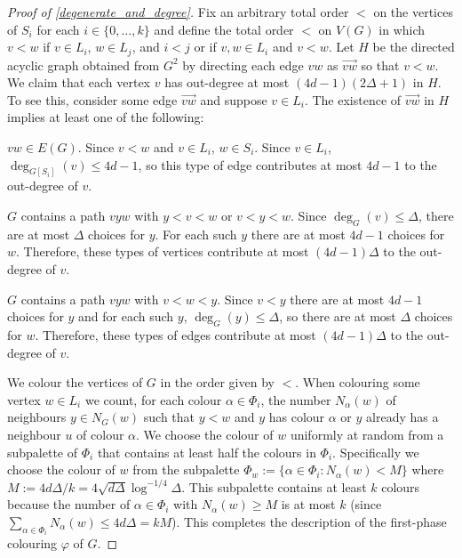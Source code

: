 \documentclass{patmorin}
\begin{document}
\begin{proof}[Proof of \cref{degenerate_and_degree}]
  Fix an arbitrary total order $<$ on the vertices of $S_i$ for each $i\in\{0,\ldots,k\}$ and define the total order $<$ on $V(G)$ in which $v <w$ if $v\in L_i$, $w\in L_j$, and $i<j$ or if $v,w\in L_i$ and $v<w$.  Let $H$ be the directed acyclic graph obtained from $G^2$ by directing each edge $vw$ as $\overrightarrow{vw}$ so that $v<w$.  We claim that each vertex $v$ has out-degree at most $(4d-1)(2\Delta+1)$ in $H$.  To see this, consider some edge $\overrightarrow{vw}$ and suppose $v\in L_i$.  The existence of $\overrightarrow{vw}$ in $H$ implies at least one of the following:
  \begin{compactenum}
    \item $vw\in E(G)$.  Since $v<w$ and $v\in L_i$, $w\in S_i$.  Since $v\in L_i$, $\deg_{G[S_i]}(v)\le 4d-1$, so this type of edge contributes at most $4d-1$ to the out-degree of $v$.
    \item $G$ contains a path $vyw$ with $y < v < w$ or $v < y < w$.  Since $\deg_G(v)\le\Delta$, there are at most $\Delta$ choices for $y$.  For each such $y$ there are at most $4d-1$ choices for $w$.  Therefore, these types of vertices contribute at most $(4d-1)\Delta$ to the out-degree of $v$.
    \item $G$ contains a path $vyw$ with $v < w < y$.  Since $v<y$ there are at most $4d-1$ choices for $y$ and for each such $y$, $\deg_G(y)\le\Delta$, so there are at most $\Delta$ choices for $w$.  Therefore, these types of edges contribute at most $(4d-1)\Delta$ to the out-degree of $v$.
  \end{compactenum}
  We colour the vertices of $G$ in the order given by $<$.  When colouring some vertex $w\in L_i$ we count, for each colour $\alpha\in \Phi_i$, the number $N_\alpha(w)$ of neighbours $y\in N_G(w)$ such that $y < w$ and $y$ has colour $\alpha$ or $y$ already has a neighbour $u$ of colour $\alpha$.  We choose the colour of $w$ uniformly at random from a subpalette of $\Phi_i$ that contains at least half the colours in $\Phi_i$.  Specifically we choose the colour of $w$ from the subpalette $\Phi_w:=\{\alpha\in\Phi_i: N_{\alpha}(w)<M\}$ where $M:=4d\Delta/k = 4\sqrt{d\Delta}\log^{-1/4}\Delta$.  This subpalette contains at least $k$ colours because the number of $\alpha\in\Phi_i$ with $N_\alpha(w)\ge M$ is at most $k$   (since $\sum_{\alpha\in\Phi_i} N_\alpha(w) \le 4d\Delta = kM$).
  This completes the description of the first-phase colouring $\varphi$ of $G$.


\end{proof}
\end{document}
